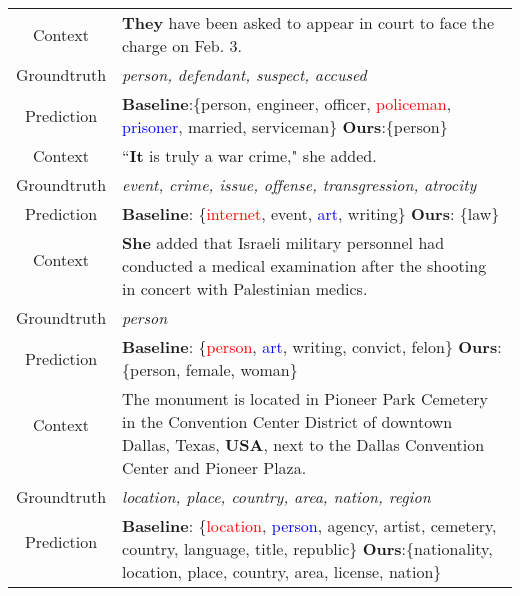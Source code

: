 \documentclass[11pt,a4paper]{article}
\begin{document}
\begin{table*}[t]
    \centering
    \small
    \begin{tabular}{c|l}
    \toprule
        
        Context & \multirow{1}{13cm}{\textbf{They} have been asked to appear in court to face the charge on Feb. 3.}\\
        Groundtruth & \textit{person, defendant, suspect, accused} \\ 
        Prediction & \textbf{Baseline}:\{person, engineer, officer, \textcolor{red}{policeman}, \textcolor{blue}{prisoner}, married, serviceman\} \textbf{Ours}:\{person\}\\  \midrule
        
        Context & \multirow{1}{13cm}{``\textbf{It} is truly a war crime," she added.} \\
        Groundtruth & \textit{event, crime, issue, offense, transgression, atrocity} \\
        Prediction & \textbf{Baseline}: \{\textcolor{red}{internet}, event, \textcolor{blue}{art}, writing\} \textbf{Ours}: \{law\}\\ \midrule
        
         Context & \multirow{2}{13cm}{\textbf{She} added that Israeli military personnel had conducted a medical examination after the shooting in concert with Palestinian medics.} \\
        & \\
        Groundtruth & \textit{person} \\
        Prediction & \textbf{Baseline}: \{\textcolor{red}{person}, \textcolor{blue}{art}, writing, convict, felon\} \textbf{Ours}: \{person, female, woman\} \\ \midrule 
        
        
        Context & \multirow{2}{13cm}{The monument is located in Pioneer Park Cemetery in the Convention Center District of downtown Dallas, Texas, \textbf{USA}, next to the Dallas Convention Center and Pioneer Plaza.}\\
        & \\
        Groundtruth & \textit{location, place, country, area, nation, region}\\
        Prediction & \multirow{2}{13cm}{\textbf{Baseline}: \{\textcolor{red}{location}, \textcolor{blue}{person}, agency, artist, cemetery, country, language, title, republic\} \textbf{Ours}:\{nationality, location, place, country, area, license, nation\}}\\ 
        & \\ \midrule
        

\end{tabular}
\end{table*}
\end{document}
